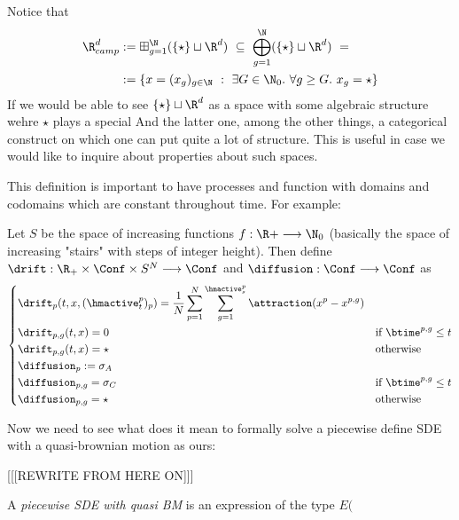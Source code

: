 \begin{remark}
	Notice that 
	\begin{align*}
		\R^d_{camp}
		&:=\boxplus_{g=1}^\N (\{\star\} \sqcup \R^d)\
		\subseteq\
		\bigoplus_{g=1}^\N (\{\star\} \sqcup \R^d)\
		=
		\\
		&:=
		\{
			x = (x_g)_{g\in\N}\
			:\
			\exists G\in\N_0.\
			\forall g\geq G.\
			x_g =\star
		\}
	\end{align*}
	If we would be able to see $\{\star\} \sqcup \R^d$ as a space with some algebraic structure wehre $\star$ plays a special
	And the latter one, among the other things, a categorical construct on which one can put quite a lot of structure.
	This is useful in case we would like to inquire about properties about such spaces.
\end{remark}


This definition is important to have processes and function with domains and codomains which are constant throughout time.
For example:

\begin{definition}\label{ch3:formal-def-drift-diffus}
	Let $S$ be the space of \cadlag increasing functions $f:\R+ \longrightarrow \N_0$ (basically the space of increasing "stairs" with steps of integer height). Then define $\drift: \R_+ \times \Conf \times S^N \longrightarrow \Conf$ and $\diffusion: \Conf \longrightarrow \Conf$ as
\begin{equation}
\left\{
\begin{aligned}
&\drift_p(t,x,(\hmactive_t^p)_p) = \frac{1}{N} \sum _{p = 1}^{N} \sum_{g = 1}^{\hmactive_s^p} \attraction(x^p - x^{p,g})
	&&
\\
&\drift_{p,g}(t,x) = 0
	&& \text{if } \btime^{p,g} \leq t
\\
&\drift_{p,g}(t,x) = \star
	&& \text{otherwise}
\\
&\diffusion_p:= \sigma_A
&
\\
&\diffusion_{p,g} = \sigma_C
&& \text{if } \btime^{p,g} \leq t
\\
&\diffusion_{p,g} = \star
&& \text{otherwise}
\end{aligned}
\right.
\end{equation}
\end{definition}

Now we need to see what does it mean to formally solve a piecewise define SDE with a quasi-brownian motion as ours:

[[[REWRITE FROM HERE ON]]]


\begin{definition}
A \emph{piecewise SDE with quasi BM} is an expression of the type $E($
\end{definition}



